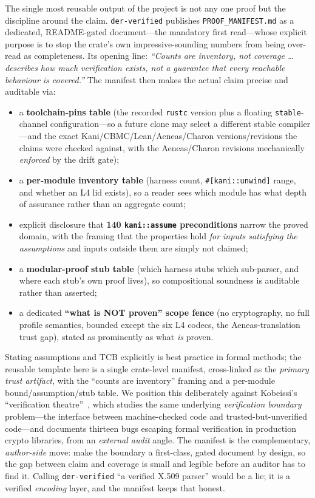 \documentclass[10pt,twocolumn]{article}
\newcommand{\code}[1]{\texttt{\small #1}}
\newcommand{\crate}{\code{der-verified}}
\begin{document}
The single most reusable output of the project is not any one proof but the
discipline around the claim. \crate{} publishes \code{PROOF\_MANIFEST.md} as a
dedicated, README-gated document---the mandatory first read---whose explicit
purpose is to stop the crate's own impressive-sounding numbers from being
over-read as completeness. Its opening line: \emph{``Counts are inventory, not
coverage \ldots{} describes how much verification exists, not a guarantee that
every reachable behaviour is covered.''} The manifest then makes the actual
claim precise and auditable via:
\begin{itemize}
\item a \textbf{toolchain-pins table} (the recorded \code{rustc} version plus a
  floating \code{stable}-channel configuration---so a future clone may select a
  different stable compiler---and the exact Kani/CBMC/Lean/Aeneas/Charon
  versions/revisions the claims were checked against, with the Aeneas/Charon
  revisions mechanically \emph{enforced} by the drift gate);
\item a \textbf{per-module inventory table} (harness count, \code{\#[kani::unwind]}
  range, and whether an L4 lid exists), so a reader sees which module has what
  depth of assurance rather than an aggregate count;
\item explicit disclosure that \textbf{140 \code{kani::assume} preconditions}
  narrow the proved domain, with the framing that the properties hold
  \emph{for inputs satisfying the assumptions} and inputs outside them are
  simply not claimed;
\item a \textbf{modular-proof stub table} (which harness stubs which
  sub-parser, and where each stub's own proof lives), so compositional
  soundness is auditable rather than asserted;
\item a dedicated \textbf{``what is NOT proven'' scope fence} (no cryptography,
  no full profile semantics, bounded except the six L4 codecs, the
  Aeneas-translation trust gap), stated as prominently as what \emph{is}
  proven.
\end{itemize}
Stating assumptions and TCB explicitly is best practice in formal methods; the
reusable template here is a single crate-level manifest, cross-linked as the
\emph{primary trust artifact}, with the ``counts are inventory'' framing and a
per-module bound/assumption/stub table. We position this deliberately against
Kobeissi's ``verification theatre''~\cite{theatre}, which studies the same
underlying \emph{verification boundary} problem---the interface between
machine-checked code and trusted-but-unverified code---and documents thirteen
bugs escaping formal verification in production crypto libraries, from an
\emph{external audit} angle. The manifest is the complementary, \emph{author-side}
move: make the boundary a first-class, gated document by design, so the gap
between claim and coverage is small and legible before an auditor has to find
it. Calling \crate{} ``a verified X.509 parser'' would be a lie; it is a
verified \emph{encoding} layer, and the manifest keeps that honest.
\end{document}
